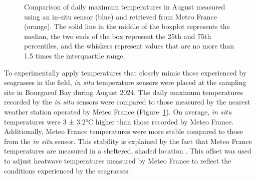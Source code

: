 \documentclass[
  number]{elsarticle}
\begin{document}
\label{cell-fig-Temperature_Bourgneuf}
\begin{figure}[H]


\caption{\label{fig-Temperature_Bourgneuf}Comparison of daily maximum
temperatures in August measured using an in-situ sensor (blue) and
retrieved from Meteo France (orange). The solid line in the middle of
the boxplot represents the median, the two ends of the box represent the
25th and 75th percentiles, and the whiskers represent values that are no
more than 1.5 times the interquartile range.}

\end{figure}%

To experimentally apply temperatures that closely mimic those
experienced by seagrasses in the field, \emph{in situ} temperature
sensors were placed at the sampling site in Bourgneuf Bay during August
2024. The daily maximum temperatures recorded by the \emph{in situ}
sensors were compared to those measured by the nearest weather station
operated by Meteo France (Figure~\ref{fig-Temperature_Bourgneuf}). On
average, \emph{in situ} temperatures were 3 ± 3.2°C higher than those
recorded by Meteo France. Additionally, Meteo France temperatures were
more stable compared to those from the \emph{in situ} sensor. This
stability is explained by the fact that Meteo France temperatures are
measured in a sheltered, shaded location . This offset was used to
adjust heatwave temperatures measured by Meteo France to reflect the
conditions experienced by the seagrasses.
\end{document}
